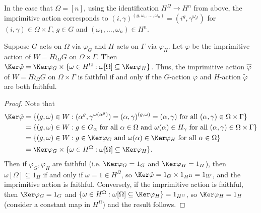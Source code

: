 In the case that $\Omega = [n]$, using the identification $H^\Omega \to H^n$ from above, the imprimitive action corresponds to $(i,\gamma)^{(g,\omega_1,\dotsc,\omega_n)} = (i^g,\gamma^{\omega_{i^g}})$ for $(i,\gamma) \in \Omega \times \Gamma$, $g \in G$ and $(\omega_1,\dotsc,\omega_n) \in H^n$.

\begin{proposition}
    Suppose $G$ acts on $\Omega$ via $\varphi_G$ and $H$ acts on $\Gamma$ via $\varphi_H$. Let $\hat\varphi$ be the imprimitive action of $W = H \wr_\Omega G$ on $\Omega \times \Gamma$. Then $\Ker\hat\varphi = \Ker\varphi_G \times \{\omega \in H^\Omega : \omega[\Omega] \subseteq \Ker\varphi_H\}$. Thus, the imprimitive action $\hat\varphi$ of $W = H \wr_\Omega G$ on $\Omega \times \Gamma$ is faithful if and only if the $G$-action $\varphi$ and $H$-action $\tilde\varphi$ are both faithful.
\end{proposition}

\begin{proof}
    Note that
    \begin{align*}
        \Ker\hat\varphi & = \{(g,\omega) \in W : (\alpha^g,\gamma^{\omega(\alpha^g)}) = (\alpha,\gamma)^{(g,\omega)} = (\alpha,\gamma)\ \text{for all}\ (\alpha,\gamma) \in \Omega \times \Gamma\}      \\
                        & = \{(g,\omega) \in W : g \in G_\alpha\ \text{for all}\ \alpha \in \Omega\ \text{and}\ \omega(\alpha) \in H_\gamma\ \text{for all}\ (\alpha,\gamma) \in \Omega \times \Gamma\} \\
                        & = \{(g,\omega) \in W : g \in \Ker\varphi_G\ \text{and}\ \omega(\alpha) \in \Ker\varphi_H\ \text{for all}\ \alpha \in \Omega\}                                                 \\
                        & = \Ker\varphi_G \times \{\omega \in H^\Omega : \omega[\Omega] \subseteq \Ker\varphi_H\}.
    \end{align*}
    Then if $\varphi_G,\varphi_H$ are faithful (i.e. $\Ker\varphi_G = 1_G$ and $\Ker\varphi_H = 1_H$), then $\omega[\Omega] \subseteq 1_H$ if and only if $\omega = 1 \in H^\Omega$, so $\Ker\hat\varphi = 1_G \times 1_{H^\Omega} = 1_W$, and the imprimitive action is faithful. Conversely, if the imprimitive action is faithful, then $\Ker\varphi_G = 1_G$ and $\{\omega \in H^\Omega : \omega[\Omega] \subseteq \Ker\varphi_H\} = 1_{H^\Omega}$, so $\Ker\varphi_H = 1_H$ (consider a constant map in $H^\Omega$) and the result follows.
\end{proof}

